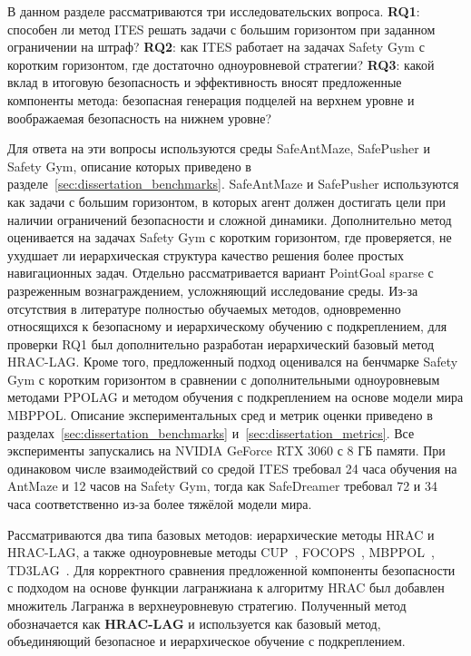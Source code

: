 В данном разделе рассматриваются три исследовательских вопроса. \textbf{RQ1}: способен ли метод ITES решать задачи с большим горизонтом при заданном ограничении на штраф? \textbf{RQ2}: как ITES работает на задачах Safety Gym с коротким горизонтом, где достаточно одноуровневой стратегии? \textbf{RQ3}: какой вклад в итоговую безопасность и эффективность вносят предложенные компоненты метода: безопасная генерация подцелей на верхнем уровне и воображаемая безопасность на нижнем уровне?

Для ответа на эти вопросы используются среды SafeAntMaze, SafePusher и Safety Gym, описание которых приведено в разделе~\ref{sec:dissertation_benchmarks}. SafeAntMaze и SafePusher используются как задачи с большим горизонтом, в которых агент должен достигать цели при наличии ограничений безопасности и сложной динамики. Дополнительно метод оценивается на задачах Safety Gym с коротким горизонтом, где проверяется, не ухудшает ли иерархическая структура качество решения более простых навигационных задач. Отдельно рассматривается вариант PointGoal sparse с разреженным вознаграждением, усложняющий исследование среды. Из-за отсутствия в литературе полностью обучаемых методов, одновременно относящихся к безопасному и иерархическому обучению с подкреплением, для проверки RQ1 был дополнительно разработан иерархический базовый метод HRAC-LAG. Кроме того, предложенный подход оценивался на бенчмарке Safety Gym с коротким горизонтом в сравнении с дополнительными одноуровневым методами PPOLAG и методом обучения с подкреплением на основе модели мира MBPPOL. Описание экспериментальных сред и метрик оценки приведено в разделах~\ref{sec:dissertation_benchmarks} и~\ref{sec:dissertation_metrics}. Все эксперименты запускались на NVIDIA GeForce RTX 3060 с 8 ГБ памяти. При одинаковом числе взаимодействий со средой ITES требовал 24 часа обучения на AntMaze и 12 часов на Safety Gym, тогда как SafeDreamer требовал 72 и 34 часа соответственно из-за более тяжёлой модели мира.

Рассматриваются два типа базовых методов: иерархические методы HRAC и HRAC-LAG, а также одноуровневые методы CUP~\cite{cup}, FOCOPS~\cite{focops}, MBPPOL~\cite{jayant2022model}, TD3LAG~\cite{ray2019benchmarking}. Для корректного сравнения предложенной компоненты безопасности с подходом на основе функции лагранжиана к алгоритму HRAC был добавлен множитель Лагранжа в верхнеуровневую стратегию. Полученный метод обозначается как \textbf{HRAC-LAG} и используется как базовый метод, объединяющий безопасное и иерархическое обучение с подкреплением.

